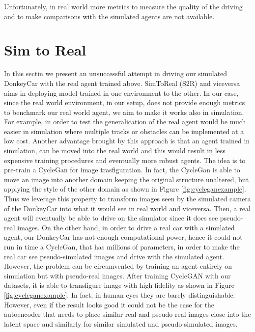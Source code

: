 Unfortunately, in real world more metrics to measure the quality of the driving and to make comparisons with the simulated agents are not available. 

\section{Sim to Real}

In this sectin we present an unsuccessful attempt in driving our simulated DonkeyCar with the real agent trained above. SimToReal (S2R) and viceversa aims in deploying model trained in one environment to the other. In our case, since the real world environment, in our setup, does not provide enough metrics to benchmark our real world agent, we aim to make it works also in simulation. For example, in order to test the generalication of the real agent would be much easier in simulation where multiple tracks or obstacles can be implemented at a low cost. Another advantage brought by this approach is that an agent trained in simulation, can be moved into the real world and this would result in less expensive training procedures and eventually more robust agents. The idea is to pre-train a CycleGan \citep{CycleGAN2017} for image trasfiguration. In fact, the CycleGan is able to move an image into another domain keeping the original structure unaltered, but applying the style of the other domain as shown in Figure \ref{fig:cycleganexample}. Thus we leverage this property to transform images seen by the simulated camera of the DonkeyCar into what it would see in real world and viceversa. Then, a real agent will eventually be able to drive on the simulator since it does see pseudo-real images. On the other hand, in order to drive a real car with a simulated agent, our DonkeyCar has not enough computational power, hence it could not run in time a CycleGan, that has millions of parameters, in order to make the real car see pseudo-simulated images and drive with the simulated agent. However, the problem can be circumvented by training an agent entirely on simulation but with pseudo-real images. After training CycleGAN with our datasets, it is able to transfigure image with high fidelity as shown in Figure \ref{fig:cycleganexample}. In fact, in human eyes they are barely distinguishable. However, even if the result looks good it could not be the case for the autoencoder that needs to place similar real and pseudo real images close into the latent space and similarly for similar simulated and pseudo simulated images.

